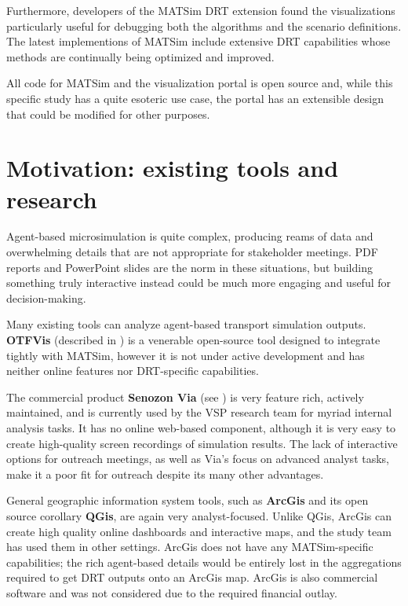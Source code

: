 Furthermore, developers of the MATSim DRT extension found the visualizations particularly useful for debugging both the algorithms and the scenario definitions. The latest implementions of MATSim include extensive DRT capabilities whose methods are continually being optimized and improved.

All code for MATSim and the visualization portal is open source and, while this specific study has a quite esoteric use case, the portal has an extensible design that could be modified for other purposes.

\section{Motivation: existing tools and research}
\label{avov-motivation}

Agent-based microsimulation is quite complex, producing reams of data and overwhelming details that are not appropriate for stakeholder meetings. PDF reports and PowerPoint slides are the norm in these situations, but building something truly interactive instead could be much more engaging and useful for decision-making.

Many existing tools can analyze agent-based transport simulation outputs. \textbf{OTFVis} (described in \cite{Srippgen2015OTFVisInBook}) is a venerable open-source tool designed to integrate tightly with MATSim, however it is not under active development and has neither online features nor DRT-specific capabilities.

The commercial product \textbf{Senozon Via} (see \cite{Rieser2015SenozonViaInBook}) is very feature rich, actively maintained, and is currently used by the VSP research team for myriad internal analysis tasks. It has no online web-based component, although it is very easy to create high-quality screen recordings of simulation results. The lack of interactive options for outreach meetings, as well as Via's focus on advanced analyst tasks, make it a poor fit for outreach despite its many other advantages.

General geographic information system tools, such as \textbf{ArcGis} and its open source corollary \textbf{QGis}, are again very analyst-focused. Unlike QGis, ArcGis can create high quality online dashboards and interactive maps, and the study team has used them in other settings. ArcGis does not have any MATSim-specific capabilities; the rich agent-based details would be entirely lost in the aggregations required to get DRT outputs onto an ArcGis map. ArcGis is also commercial software and was not considered due to the required financial outlay.

